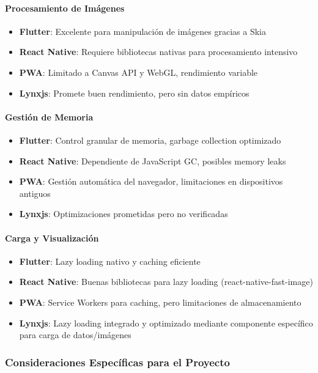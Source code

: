 \paragraph{Procesamiento de Imágenes}
\begin{itemize}
    \item \textbf{Flutter}: Excelente para manipulación de imágenes gracias a Skia
    \item \textbf{React Native}: Requiere bibliotecas nativas para procesamiento intensivo
    \item \textbf{PWA}: Limitado a Canvas API y WebGL, rendimiento variable
    \item \textbf{Lynxjs}: Promete buen rendimiento, pero sin datos empíricos
\end{itemize}

\paragraph{Gestión de Memoria}
\begin{itemize}
    \item \textbf{Flutter}: Control granular de memoria, garbage collection optimizado
    \item \textbf{React Native}: Dependiente de JavaScript GC, posibles memory leaks
    \item \textbf{PWA}: Gestión automática del navegador, limitaciones en dispositivos antiguos
    \item \textbf{Lynxjs}: Optimizaciones prometidas pero no verificadas
\end{itemize}

\paragraph{Carga y Visualización}
\begin{itemize}
    \item \textbf{Flutter}: Lazy loading nativo y caching eficiente
    \item \textbf{React Native}: Buenas bibliotecas para lazy loading (react-native-fast-image)
    \item \textbf{PWA}: Service Workers para caching, pero limitaciones de almacenamiento
    \item \textbf{Lynxjs}: Lazy loading integrado y optimizado mediante componente específico para carga de datos/imágenes
\end{itemize}

\subsubsection{Consideraciones Específicas para el Proyecto}

